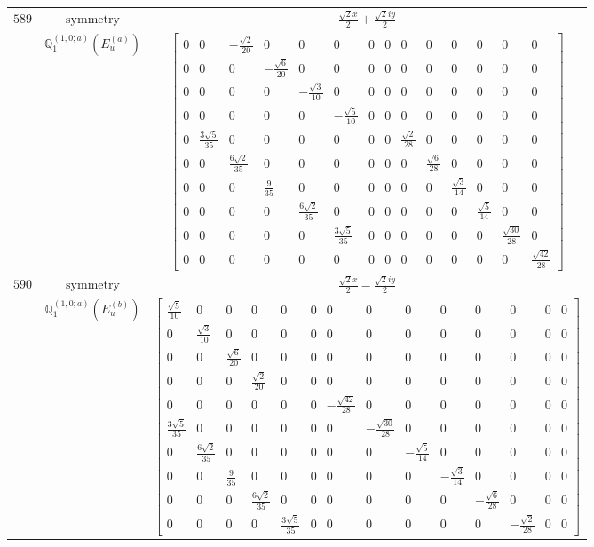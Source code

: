 \documentclass[fleqn,8pt,landscape]{jsarticle}
\begin{document}
\begin{longtable}{ccc}
$ 589 $ & $ \text{symmetry} $ & $ \frac{\sqrt{2} x}{2} + \frac{\sqrt{2} i y}{2} $ \\
$  $ & $ \mathbb{Q}_{1}^{(1,0;a)}(E_{u}^{(a)}) $ & $ \begin{bmatrix} 0 & 0 & - \frac{\sqrt{2}}{20} & 0 & 0 & 0 & 0 & 0 & 0 & 0 & 0 & 0 & 0 & 0 \\ 0 & 0 & 0 & - \frac{\sqrt{6}}{20} & 0 & 0 & 0 & 0 & 0 & 0 & 0 & 0 & 0 & 0 \\ 0 & 0 & 0 & 0 & - \frac{\sqrt{3}}{10} & 0 & 0 & 0 & 0 & 0 & 0 & 0 & 0 & 0 \\ 0 & 0 & 0 & 0 & 0 & - \frac{\sqrt{5}}{10} & 0 & 0 & 0 & 0 & 0 & 0 & 0 & 0 \\ 0 & \frac{3 \sqrt{5}}{35} & 0 & 0 & 0 & 0 & 0 & 0 & \frac{\sqrt{2}}{28} & 0 & 0 & 0 & 0 & 0 \\ 0 & 0 & \frac{6 \sqrt{2}}{35} & 0 & 0 & 0 & 0 & 0 & 0 & \frac{\sqrt{6}}{28} & 0 & 0 & 0 & 0 \\ 0 & 0 & 0 & \frac{9}{35} & 0 & 0 & 0 & 0 & 0 & 0 & \frac{\sqrt{3}}{14} & 0 & 0 & 0 \\ 0 & 0 & 0 & 0 & \frac{6 \sqrt{2}}{35} & 0 & 0 & 0 & 0 & 0 & 0 & \frac{\sqrt{5}}{14} & 0 & 0 \\ 0 & 0 & 0 & 0 & 0 & \frac{3 \sqrt{5}}{35} & 0 & 0 & 0 & 0 & 0 & 0 & \frac{\sqrt{30}}{28} & 0 \\ 0 & 0 & 0 & 0 & 0 & 0 & 0 & 0 & 0 & 0 & 0 & 0 & 0 & \frac{\sqrt{42}}{28} \end{bmatrix} $ \\ \hline
$ 590 $ & $ \text{symmetry} $ & $ \frac{\sqrt{2} x}{2} - \frac{\sqrt{2} i y}{2} $ \\
$  $ & $ \mathbb{Q}_{1}^{(1,0;a)}(E_{u}^{(b)}) $ & $ \begin{bmatrix} \frac{\sqrt{5}}{10} & 0 & 0 & 0 & 0 & 0 & 0 & 0 & 0 & 0 & 0 & 0 & 0 & 0 \\ 0 & \frac{\sqrt{3}}{10} & 0 & 0 & 0 & 0 & 0 & 0 & 0 & 0 & 0 & 0 & 0 & 0 \\ 0 & 0 & \frac{\sqrt{6}}{20} & 0 & 0 & 0 & 0 & 0 & 0 & 0 & 0 & 0 & 0 & 0 \\ 0 & 0 & 0 & \frac{\sqrt{2}}{20} & 0 & 0 & 0 & 0 & 0 & 0 & 0 & 0 & 0 & 0 \\ 0 & 0 & 0 & 0 & 0 & 0 & - \frac{\sqrt{42}}{28} & 0 & 0 & 0 & 0 & 0 & 0 & 0 \\ \frac{3 \sqrt{5}}{35} & 0 & 0 & 0 & 0 & 0 & 0 & - \frac{\sqrt{30}}{28} & 0 & 0 & 0 & 0 & 0 & 0 \\ 0 & \frac{6 \sqrt{2}}{35} & 0 & 0 & 0 & 0 & 0 & 0 & - \frac{\sqrt{5}}{14} & 0 & 0 & 0 & 0 & 0 \\ 0 & 0 & \frac{9}{35} & 0 & 0 & 0 & 0 & 0 & 0 & - \frac{\sqrt{3}}{14} & 0 & 0 & 0 & 0 \\ 0 & 0 & 0 & \frac{6 \sqrt{2}}{35} & 0 & 0 & 0 & 0 & 0 & 0 & - \frac{\sqrt{6}}{28} & 0 & 0 & 0 \\ 0 & 0 & 0 & 0 & \frac{3 \sqrt{5}}{35} & 0 & 0 & 0 & 0 & 0 & 0 & - \frac{\sqrt{2}}{28} & 0 & 0 \end{bmatrix} $ \\ \hline

\end{longtable}
\end{document}
